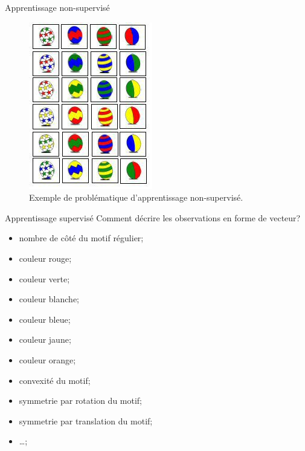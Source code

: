 \documentclass[8pt]{beamer}
\begin{document}
			\begin{frame}{Apprentissage non-supervisé}
				\begin{figure}[H]
					\includegraphics[height=.6\textheight]{images/samples/easter_non_supervised}
					\caption*{Exemple de problématique d'apprentissage non-supervisé.}
				\end{figure}
			\end{frame}

			\begin{frame}{Apprentissage supervisé}
				Comment décrire les observations en forme de vecteur?
				\begin{itemize}
					\item<2-> nombre de côté du motif régulier;
					\item<3-> couleur rouge;
					\item<4-> couleur verte;
					\item<5-> couleur blanche;
					\item<6-> couleur bleue;
					\item<7-> couleur jaune;
					\item<8-> couleur orange;
					\item<9-> convexité du motif;
					\item<10-> symmetrie par rotation du motif;
					\item<11-> symmetrie par translation du motif;
					\item<12-> \dots;
				\end{itemize}
			\end{frame}
\end{document}

